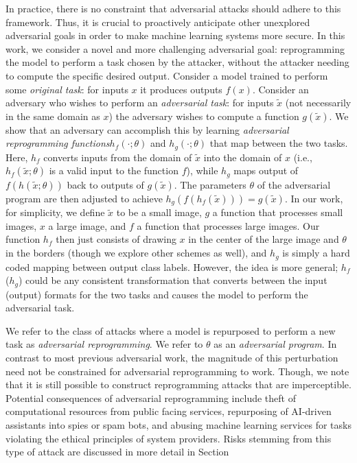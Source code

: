 \documentclass{article}
\begin{document}
 
In practice, there is no constraint that adversarial attacks should adhere to this framework. Thus, it is crucial to proactively anticipate other unexplored adversarial goals in order to make machine learning systems more secure. 
In this work, we consider a novel and more challenging adversarial goal:
reprogramming the model to perform a task chosen by the attacker,
without the attacker needing to compute the specific desired output.
Consider a model trained to perform some {\em original task}:
for inputs $x$ it produces outputs $f(x)$.
Consider an adversary who wishes to perform an {\em adversarial task}:
for inputs $\tilde{x}$ (not necessarily in the same domain as $x$)
the adversary wishes to compute a function $g(\tilde{x})$.
We show that an adversary can accomplish this by learning 
{\em adversarial reprogramming functions}$h_f(\cdot ; \theta)$ and $h_g(\cdot ; \theta)$ that map 
between the two tasks.
Here, $h_f$ converts 
inputs from the domain of $\tilde{x}$ 
into the domain of $x$ 
(i.e.,
$h_f(\tilde{x}; \theta)$ is a valid input to the function $f$), 
while $h_g$ maps output of $f(h(\tilde{x}; \theta))$ back to outputs of $g(\tilde{x})$. 
The parameters $\theta$ of the adversarial program are then adjusted to achieve
$h_g\left(
	f\left(
		h_f\left(\tilde{x}\right)
	\right)
\right) = g\left(
	\tilde{x}
\right)$.
In our work, for simplicity, 
we define $\tilde{x}$ to be a small image,
$g$ a function that processes small images,
$x$ a large image,
and $f$ a function that processes large images.
Our function $h_f$ then just consists of drawing $x$ in the center
of the large image and $\theta$ in the borders (though we explore other schemes as well), and $h_g$ is simply a hard coded mapping between output class labels. 
However, the idea is more general; $h_f$ ($h_g$) could be any consistent
transformation that converts between the input (output) formats for the two tasks
and causes the model to perform the adversarial task.

We refer to the class of attacks where a model is repurposed to
perform a new task as {\em adversarial reprogramming}.
We refer to $\theta$
as an {\em adversarial program}.
In contrast to most previous adversarial work, the magnitude of this perturbation need not be constrained for adversarial reprogramming to work. Though, we note that it is still possible to construct reprogramming attacks that are imperceptible.
Potential consequences of adversarial reprogramming include theft of computational resources from public facing services, repurposing of AI-driven assistants into spies or spam bots, and abusing machine learning services for tasks violating the ethical principles of system providers. 
Risks stemming from this type of attack are discussed in more detail in Section 
\end{document}
